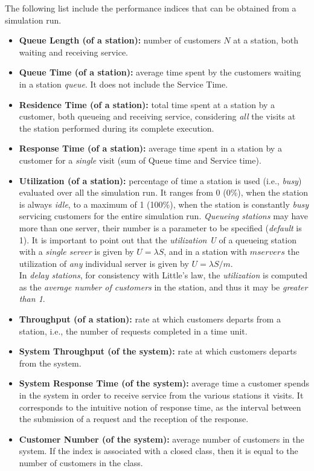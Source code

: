 The following list include the performance indices that can be obtained from
a simulation run.
\begin{itemize}
\item \textbf{Queue Length (of a station):} number of customers $N$ at a
station, both waiting and receiving service.

\item \textbf{Queue Time (of a station):} average time spent by the
customers waiting in a station \emph{queue}. It does not include the
Service Time.

\item \textbf{Residence Time (of a station):} total time spent at a
station by a customer, both queueing and receiving service,
considering \emph{all} the visits at the station performed during its complete execution.

\item \textbf{Response Time (of a station):} average time spent in a
station by a customer for a \emph{single} visit (sum of Queue time and
Service time).

\item \textbf{Utilization (of a station):} percentage of time a
station is used (i.e., \emph{busy}) evaluated over all the
simulation run. It ranges from 0 (0\%), when the station is always
\emph{idle}, to a maximum of 1 (100\%), when the station is
constantly \emph{busy} servicing customers for the entire
simulation run. \emph{Queueing stations} may have more than one
server, their number is a parameter to be specified
(\emph{default} is 1). It is important to point out that the
\emph{utilization U} of a queueing station with a \emph{single
server} is given by $U=\lambda S$, and in a station with $m
servers$ the utilization of \emph{any} individual server
is given by $U=\lambda S /m$.\\
In \emph{delay stations}, for consistency with Little's law, the
\emph{utilization} is computed as the \emph{average number of
customers} in the station, and thus it may be \emph{greater than
1}.

\item \textbf{Throughput (of a station):} rate at which customers
departs from a station, i.e., the number of requests completed in
a time unit.

\item \textbf{System Throughput (of the system):} rate at which customers departs
from the system.

\item \textbf{System Response Time (of the system):} average time a customer
spends in the system in order to receive service from the various
stations it visits. It corresponds to the intuitive notion of
response time, as the interval between the submission of a request
and the reception of the response.

\item \textbf{Customer Number (of the system):} average number of
customers in the system. If the index is associated with a closed
class, then it is equal to the number of customers in the class.
\end{itemize}
